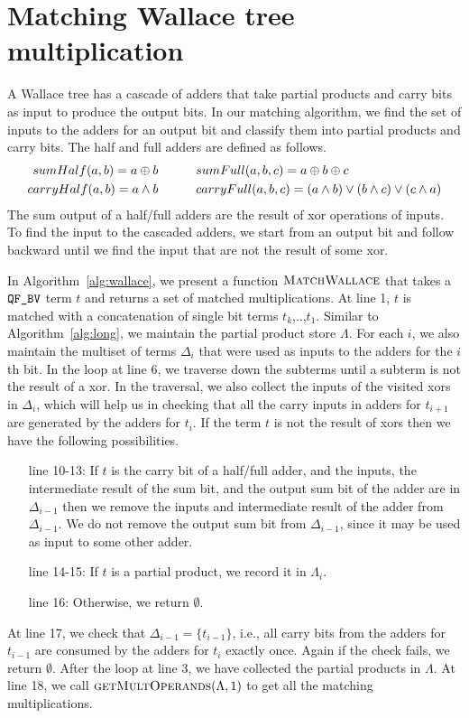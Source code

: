 \section{Matching Wallace tree multiplication}


A Wallace tree has a cascade of adders that take partial products 
and carry bits as input to produce the output bits.
%
In our matching algorithm, we find the set of inputs
to the adders for an output bit and classify them into
partial products and carry bits.
%
The half and full adders are defined as follows.
\begin{align*}
sumHalf(a,b) = a \oplus b  \qquad& \quad sumFull(a,b,c) = a \oplus b \oplus c\\
carryHalf(a,b) = a \land b \qquad&\quad
carryFull(a,b,c) = (a \land b) \lor (b \land c) \lor (c \land a)
\end{align*}
%
The sum output of a half/full adders are the result of 
xor operations of inputs.
%
To find the input to the cascaded adders, we start from an
output bit and follow backward until we find the input that
are not the result of some xor.

In Algorithm~\ref{alg:wallace}, we present a function
$\textsc{MatchWallace}$ that takes a $\texttt{QF\_BV}$ term $t$ and returns a
set of matched multiplications.
%
At line 1, $t$ is matched with a concatenation of single bit terms $t_k$,..,$t_1$.
%
Similar to Algorithm~\ref{alg:long},
we maintain the partial product store $\Lambda$.
%
For each $i$,
we also maintain the multiset of terms $\Delta_i$ that were used as 
inputs to the adders for the $i$th bit.
%
In the loop at line 6, we traverse down the subterms until
a subterm is not the result of a xor.
%
In the traversal, we also collect the inputs of the visited xors
in $\Delta_i$, which
will help us in checking that all the carry inputs in adders for $t_{i+1}$
are generated by the adders for $t_i$.
%
If the term $t$ is not the result of xors then
we have the following possibilities.
%
\begin{itemize}
\item[line 10-13:]
  If $t$ is the carry bit of a half/full adder, and the inputs, the intermediate
  result of the sum bit, and the output sum bit
  of the adder are in $\Delta_{i-1}$ then we remove the inputs and intermediate result
  of the adder from $\Delta_{i-1}$.
  We do not remove the output sum bit from $\Delta_{i-1}$, since it may be
  used as input to some other adder.
\item[line 14-15:] If $t$ is a partial product, we record it in $\Lambda_i$.
\item[line 16:] Otherwise, we return $\emptyset$.
\end{itemize}
At line 17, we check that $\Delta_{i-1} = \{t_{i-1}\}$, i.e., all carry bits from
the adders for $t_{i-1}$ are consumed by the adders for $t_i$ exactly once.
%
Again if the check fails, we return $\emptyset$.
%
After the loop at line 3, we have collected the partial products in $\Lambda$.
%
At line 18, we call $\textsc{getMultOperands}(\Lambda,1)$ to get all
the matching multiplications.

